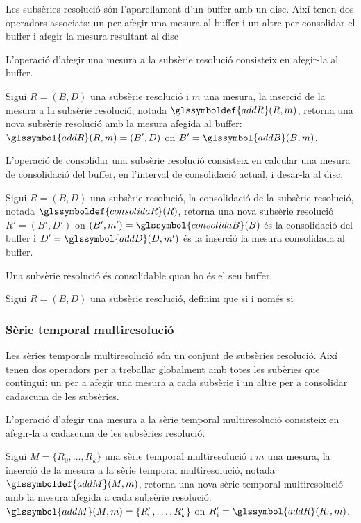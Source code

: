 Les subsèries resolució són l'aparellament d'un buffer amb un disc.
Així tenen dos operadors associats: un per afegir una mesura al buffer i
un altre per consolidar el buffer i afegir la mesura resultant al disc


L'operació d'afegir una mesura a la subsèrie resolució consisteix en
afegir-la al buffer.
\begin{definition}
  Sigui $R=(B,D)$ una subsèrie resolució i $m$ una mesura, la
  inserció de la mesura a la subsèrie resolució, notada 
  $\glssymboldef{addR}(R,m)$, retorna una nova subsèrie resolució 
  amb la mesura afegida al buffer: $\glssymbol{addR}(R,m) = (B',D)$ 
  on $B'=\glssymbol{addB}(B,m)$.
\end{definition}


L'operació de consolidar una subsèrie resolució consisteix en calcular
una mesura de consolidació del buffer, en l'interval de consolidació
actual, i desar-la al disc. 
\begin{definition}
  Sigui $R=(B,D)$ una subsèrie resolució, la consolidació de la
  subsèrie resolució, notada $\glssymboldef{consolidaR}(R)$, retorna
  una nova subsèrie resolució $R'=(B',D')$ on $(B',m') =
  \glssymbol{consolidaB}(B)$ és la consolidació del buffer i
  $D'=\glssymbol{addD}(D,m')$ és la inserció la mesura consolidada al
  buffer.
\end{definition}

Una subsèrie resolució és consolidable quan ho és el seu buffer.
\begin{definition}
  Sigui $R=(B,D)$ una subsèrie resolució, definim que
   si i només si 
\end{definition}



\subsubsection{Sèrie temporal multiresolució}

Les sèries temporals multiresolució són un conjunt de subsèries
resolució. Així tenen dos operadors per a treballar globalment amb
totes les subèries que contingui: un per a afegir una mesura a cada
subsèrie i un altre per a consolidar cadascuna de les subsèries.


L'operació d'afegir una mesura a la sèrie temporal multiresolució
consisteix en afegir-la a cadascuna de les subsèries resolució.
\begin{definition}
  Sigui $M=\{R_0,\dotsc,R_k\}$ una sèrie temporal multiresolució i $m$
  una mesura, la inserció de la mesura a la sèrie temporal
  multiresolució, notada $\glssymboldef{addM}(M,m)$, retorna una nova
  sèrie temporal multiresolució amb la
  mesura afegida a cada subsèrie resolució: $\glssymbol{addM}(M,m) =
  \{R_0',\dotsc,R_k'\}$ on  $R_i'=\glssymbol{addR}(R_i,m)$.
\end{definition}


